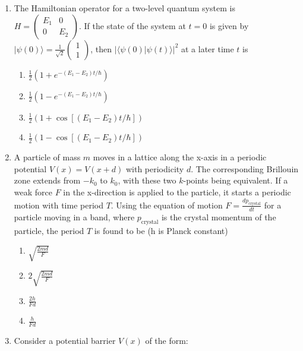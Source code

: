 \documentclass[journal,12pt,onecolumn]{IEEEtran}
\theoremstyle{remark}
\begin{document}
\begin{enumerate}
\item The Hamiltonian operator for a two-level quantum system is $H = \begin{pmatrix} E_1 & 0 \\ 0 & E_2 \end{pmatrix}$. If the state of the system at $t = 0$ is given by $\lvert \psi (0) \rangle = \frac{1}{\sqrt{2}} \begin{pmatrix} 1 \\ 1 \end{pmatrix}$, then $\lvert \langle \psi (0) | \psi (t) \rangle \rvert ^2$ at a later time $t$ is
\begin{multicols}{2}
	\begin{enumerate}
		\item $\frac{1}{2} \left( 1 + e^{-(E_1 - E_2)t/\hbar} \right)$
		\item $\frac{1}{2} \left( 1 - e^{-(E_1 - E_2)t/\hbar} \right)$
		\item $\frac{1}{2} \left( 1 + \cos[(E_1 - E_2)t/\hbar] \right)$
		\item $\frac{1}{2} \left( 1 - \cos[(E_1 - E_2)t/\hbar] \right)$
	\end{enumerate}
\end{multicols}

\item A particle of mass $m$ moves in a lattice along the x-axis in a periodic potential $V(x) = V(x + d)$ with periodicity $d$. The corresponding Brillouin zone extends from $-k_0$ to $k_0$, with these two $k$-points being equivalent. If a weak force $F$ in the x-direction is applied to the particle, it starts a periodic motion with time period $T$. Using the equation of motion $F = \frac{dp_{\text{crystal}}}{dt}$ for a particle moving in a band, where $p_{\text{crystal}}$ is the crystal momentum of the particle, the period $T$ is found to be (h is Planck constant)
\begin{multicols}{4}
	\begin{enumerate}
		\item $\sqrt{\frac{2md}{F}}$
		\item $2 \sqrt{\frac{2md}{F}}$
		\item $\frac{2h}{Fd}$
		\item $\frac{h}{Fd}$
	\end{enumerate}
\end{multicols}
\item Consider a potential barrier \( V(x) \) of the form:

\begin{center}
\end{center}
\end{enumerate}
\end{document}
